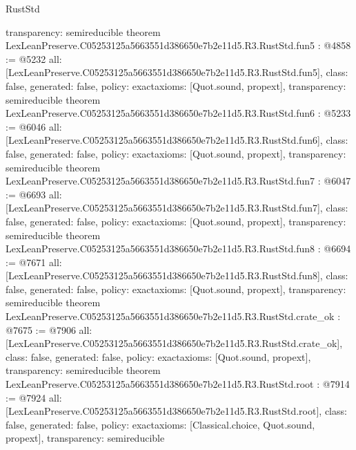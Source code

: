 \begin{lexlean}{RustStd}
\begin{coremodule}
{  transparency: semireducible
}
theorem LexLeanPreserve.C05253125a5663551d386650e7b2e11d5.R3.RustStd.fun5 : @4858 := @5232 {
  all: [LexLeanPreserve.C05253125a5663551d386650e7b2e11d5.R3.RustStd.fun5],
  class: false,
  generated: false,
  policy: exact{axioms: [Quot.sound, propext]},
  transparency: semireducible
}
theorem LexLeanPreserve.C05253125a5663551d386650e7b2e11d5.R3.RustStd.fun6 : @5233 := @6046 {
  all: [LexLeanPreserve.C05253125a5663551d386650e7b2e11d5.R3.RustStd.fun6],
  class: false,
  generated: false,
  policy: exact{axioms: [Quot.sound, propext]},
  transparency: semireducible
}
theorem LexLeanPreserve.C05253125a5663551d386650e7b2e11d5.R3.RustStd.fun7 : @6047 := @6693 {
  all: [LexLeanPreserve.C05253125a5663551d386650e7b2e11d5.R3.RustStd.fun7],
  class: false,
  generated: false,
  policy: exact{axioms: [Quot.sound, propext]},
  transparency: semireducible
}
theorem LexLeanPreserve.C05253125a5663551d386650e7b2e11d5.R3.RustStd.fun8 : @6694 := @7671 {
  all: [LexLeanPreserve.C05253125a5663551d386650e7b2e11d5.R3.RustStd.fun8],
  class: false,
  generated: false,
  policy: exact{axioms: [Quot.sound, propext]},
  transparency: semireducible
}
theorem LexLeanPreserve.C05253125a5663551d386650e7b2e11d5.R3.RustStd.crate_ok : @7675 := @7906 {
  all: [LexLeanPreserve.C05253125a5663551d386650e7b2e11d5.R3.RustStd.crate_ok],
  class: false,
  generated: false,
  policy: exact{axioms: [Quot.sound, propext]},
  transparency: semireducible
}
theorem LexLeanPreserve.C05253125a5663551d386650e7b2e11d5.R3.RustStd.root : @7914 := @7924 {
  all: [LexLeanPreserve.C05253125a5663551d386650e7b2e11d5.R3.RustStd.root],
  class: false,
  generated: false,
  policy: exact{axioms: [Classical.choice, Quot.sound, propext]},
  transparency: semireducible
}


\end{coremodule}
\end{lexlean}
